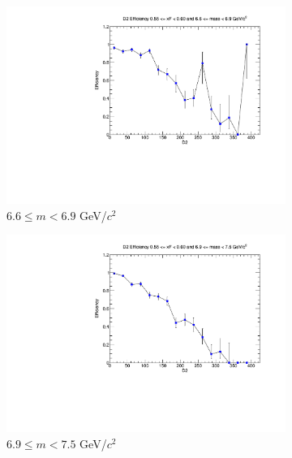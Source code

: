 \documentclass[11pt]{article}
\begin{document}
\begin{figure}[p]
\begin{subfigure}[b]{0.32\textwidth}
        \includegraphics[width=\textwidth]{./kTrackerEfficiencyPlots/D2_Efficiency_xF11_mass8.pdf}
        \caption{$6.6 \leq m < 6.9$ GeV/$c^2$}
    \end{subfigure}\vspace{0.5cm}
    \begin{subfigure}[b]{0.32\textwidth}
        \centering
        \includegraphics[width=\textwidth]{./kTrackerEfficiencyPlots/D2_Efficiency_xF11_mass9.pdf}
        \caption{$6.9 \leq m < 7.5$ GeV/$c^2$}
    \end{subfigure}\hfill
    \begin{subfigure}[b]{0.32\textwidth}
        \centering

\end{subfigure}
\end{figure}
\end{document}
